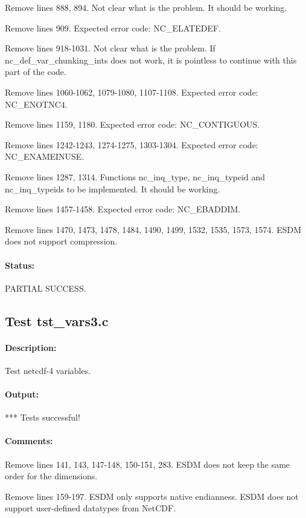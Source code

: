 Remove lines 888, 894. Not clear what is the problem. It should be working.

Remove lines 909. Expected error code: NC\_ELATEDEF.

Remove lines 918-1031. Not clear what is the problem. If nc\_def\_var\_chunking\_ints does not work, it is pointless to continue with this part of the code.

Remove lines 1060-1062, 1079-1080, 1107-1108. Expected error code: NC\_ENOTNC4.

Remove lines 1159, 1180. Expected error code: NC\_CONTIGUOUS.

Remove lines 1242-1243, 1274-1275, 1303-1304. Expected error code: NC\_ENAMEINUSE.

Remove lines 1287, 1314. Functions nc\_inq\_type, nc\_inq\_typeid and nc\_inq\_typeids to be implemented. It should be working.

Remove lines 1457-1458. Expected error code: NC\_EBADDIM.

Remove lines 1470, 1473, 1478, 1484, 1490, 1499, 1532, 1535, 1573, 1574. ESDM does not support compression.

\paragraph{Status:} PARTIAL SUCCESS.

\subsection{Test tst\_vars3.c}

\paragraph{Description:} Test netcdf-4 variables.

\paragraph{Output:} *** Tests successful!

\paragraph{Comments:} Remove lines 141, 143, 147-148, 150-151, 283. ESDM does not keep the same order for the dimensions.

Remove lines 159-197. ESDM only supports native endianness. ESDM does not support user-defined datatypes from NetCDF.

